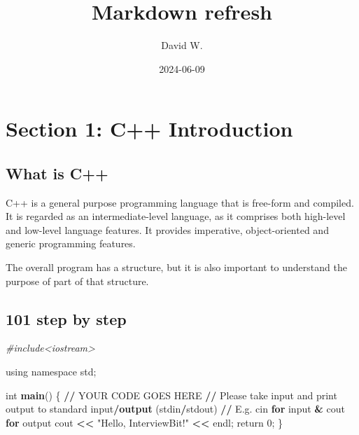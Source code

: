 \documentclass[
]{article}
\title{Markdown refresh}
\author{David W.}
\date{2024-06-09}
\newenvironment{Shaded}{\begin{snugshade}}{\end{snugshade}}
\newcommand{\CommentTok}[1]{\textcolor[rgb]{0.56,0.35,0.01}{\textit{#1}}}
\newcommand{\ControlFlowTok}[1]{\textcolor[rgb]{0.13,0.29,0.53}{\textbf{#1}}}
\newcommand{\DecValTok}[1]{\textcolor[rgb]{0.00,0.00,0.81}{#1}}
\newcommand{\ErrorTok}[1]{\textcolor[rgb]{0.64,0.00,0.00}{\textbf{#1}}}
\newcommand{\FunctionTok}[1]{\textcolor[rgb]{0.13,0.29,0.53}{\textbf{#1}}}
\newcommand{\NormalTok}[1]{#1}
\newcommand{\SpecialCharTok}[1]{\textcolor[rgb]{0.81,0.36,0.00}{\textbf{#1}}}
\newcommand{\StringTok}[1]{\textcolor[rgb]{0.31,0.60,0.02}{#1}}
\begin{document}
\maketitle

\section{Section 1: C++ Introduction}\label{section-1-c-introduction}

\subsection{What is C++}\label{what-is-c}

C++ is a general purpose programming language that is free-form and
compiled. It is regarded as an intermediate-level language, as it
comprises both high-level and low-level language features. It provides
imperative, object-oriented and generic programming features.

The overall program has a structure, but it is also important to
understand the purpose of part of that structure.

\subsection{101 step by step}\label{step-by-step}

\begin{Shaded}
\begin{Highlighting}[]
\CommentTok{\#include\textless{}iostream\textgreater{}}

\NormalTok{using namespace std;}

\NormalTok{int }\FunctionTok{main}\NormalTok{()  \{}
    \SpecialCharTok{/}\ErrorTok{/}\NormalTok{ YOUR CODE GOES HERE}
    \SpecialCharTok{/}\ErrorTok{/}\NormalTok{ Please take input and print output to standard input}\SpecialCharTok{/}\FunctionTok{output}\NormalTok{ (stdin}\SpecialCharTok{/}\NormalTok{stdout)}
    \SpecialCharTok{/}\ErrorTok{/}\NormalTok{ E.g. }\StringTok{\textquotesingle{}cin\textquotesingle{}} \ControlFlowTok{for}\NormalTok{ input }\SpecialCharTok{\&} \StringTok{\textquotesingle{}cout\textquotesingle{}} \ControlFlowTok{for}\NormalTok{ output}
\NormalTok{    cout }\SpecialCharTok{\textless{}}\ErrorTok{\textless{}} \StringTok{"Hello, InterviewBit!"} \SpecialCharTok{\textless{}}\ErrorTok{\textless{}}\NormalTok{ endl;}
\NormalTok{    return }\DecValTok{0}\NormalTok{;}
\NormalTok{\}}
\end{Highlighting}
\end{Shaded}
\end{document}
